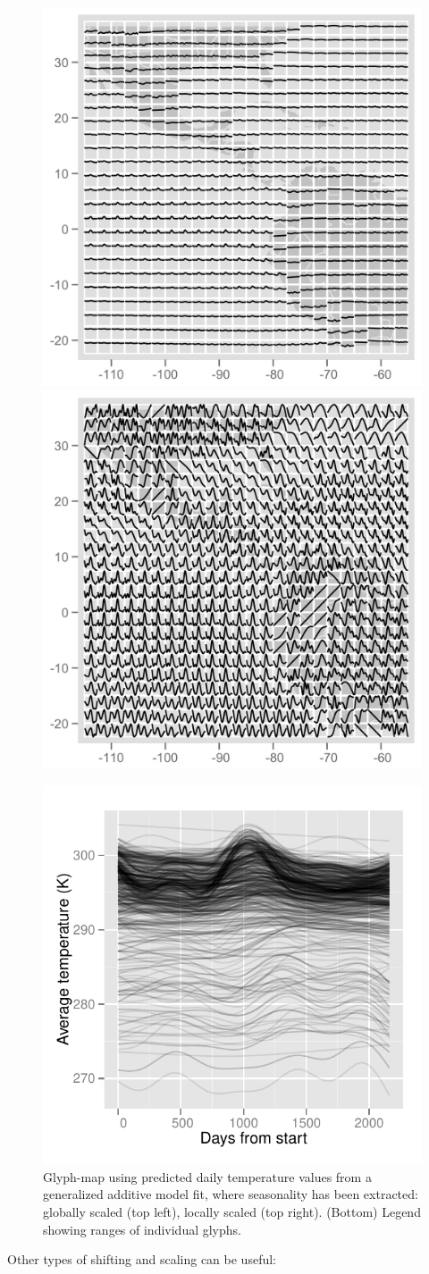 \documentclass[oneside]{article}
\begin{document}
\begin{figure}[htbp]
  \centering
  \includegraphics[width=0.5\linewidth]{month-rescale-none}%
  \includegraphics[width=0.5\linewidth]{month-rescale01}

  \includegraphics[width=0.33\linewidth]{month-rescale-legend}

  \caption{Glyph-map using predicted daily temperature values from a generalized additive model fit, where seasonality has been extracted: globally scaled (top left), locally scaled (top right). (Bottom) Legend showing ranges of individual glyphs.}
  \label{fig:scaling}
\end{figure}

Other types of shifting and scaling can be useful:
\end{document}
